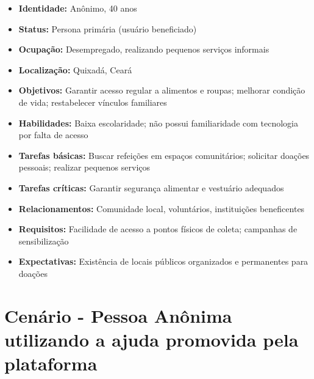 \documentclass[a4paper,12pt]{article}
\begin{document}
\begin{itemize}
    \item \textbf{Identidade:} Anônimo, 40 anos
    \item \textbf{Status:} Persona primária (usuário beneficiado)
    \item \textbf{Ocupação:} Desempregado, realizando pequenos serviços informais
    \item \textbf{Localização:} Quixadá, Ceará
    \item \textbf{Objetivos:} Garantir acesso regular a alimentos e roupas; melhorar condição de vida; restabelecer vínculos familiares
    \item \textbf{Habilidades:} Baixa escolaridade; não possui familiaridade com tecnologia por falta de acesso
    \item \textbf{Tarefas básicas:} Buscar refeições em espaços comunitários; solicitar doações pessoais; realizar pequenos serviços
    \item \textbf{Tarefas críticas:} Garantir segurança alimentar e vestuário adequados
    \item \textbf{Relacionamentos:} Comunidade local, voluntários, instituições beneficentes
    \item \textbf{Requisitos:} Facilidade de acesso a pontos físicos de coleta; campanhas de sensibilização
    \item \textbf{Expectativas:} Existência de locais públicos organizados e permanentes para doações
\end{itemize}

\section{Cenário - Pessoa Anônima utilizando a ajuda promovida pela plataforma}
\end{document}
